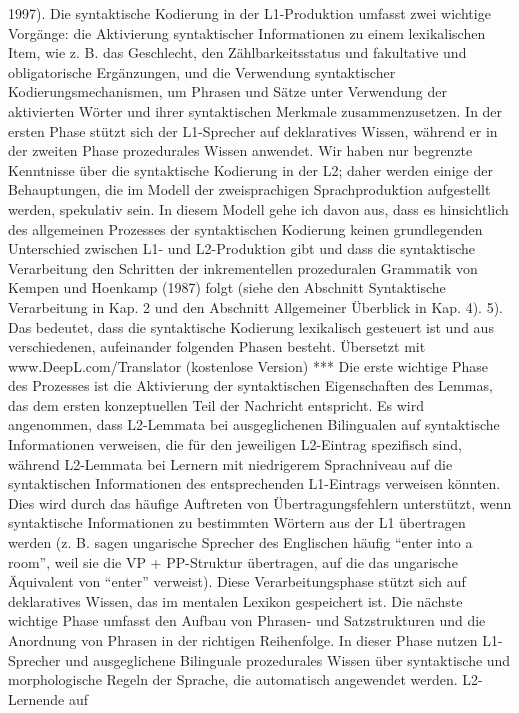 \documentclass[
  letterpaper,
]{scrbook}
\begin{document}
{{1997). Die syntaktische Kodierung in der L1-Produktion umfasst zwei
wichtige Vorgänge: die Aktivierung syntaktischer Informationen zu einem
lexikalischen Item, wie z. B. das Geschlecht, den Zählbarkeitsstatus und
fakultative und obligatorische Ergänzungen, und die Verwendung
syntaktischer Kodierungsmechanismen, um Phrasen und Sätze unter
Verwendung der aktivierten Wörter und ihrer syntaktischen Merkmale
zusammenzusetzen. In der ersten Phase stützt sich der L1-Sprecher auf
deklaratives Wissen, während er in der zweiten Phase prozedurales Wissen
anwendet. Wir haben nur begrenzte Kenntnisse über die syntaktische
Kodierung in der L2; daher werden einige der Behauptungen, die im Modell
der zweisprachigen Sprachproduktion aufgestellt werden, spekulativ sein.
In diesem Modell gehe ich davon aus, dass es hinsichtlich des
allgemeinen Prozesses der syntaktischen Kodierung keinen grundlegenden
Unterschied zwischen L1- und L2-Produktion gibt und dass die
syntaktische Verarbeitung den Schritten der inkrementellen prozeduralen
Grammatik von Kempen und Hoenkamp (1987) folgt (siehe den Abschnitt
Syntaktische Verarbeitung in Kap. 2 und den Abschnitt Allgemeiner
Überblick in Kap. 4). 5). Das bedeutet, dass die syntaktische Kodierung
lexikalisch gesteuert ist und aus verschiedenen, aufeinander folgenden
Phasen besteht. }} Übersetzt mit www.DeepL.com/Translator (kostenlose
Version) *** Die erste wichtige Phase des Prozesses ist die Aktivierung
der syntaktischen Eigenschaften des Lemmas, das dem ersten konzeptuellen
Teil der Nachricht entspricht. Es wird angenommen, dass L2-Lemmata bei
ausgeglichenen Bilingualen auf syntaktische Informationen verweisen, die
für den jeweiligen L2-Eintrag spezifisch sind, während L2-Lemmata bei
Lernern mit niedrigerem Sprachniveau auf die syntaktischen Informationen
des entsprechenden L1-Eintrags verweisen könnten. Dies wird durch das
häufige Auftreten von Übertragungsfehlern unterstützt, wenn syntaktische
Informationen zu bestimmten Wörtern aus der L1 übertragen werden (z. B.
sagen ungarische Sprecher des Englischen häufig ``enter into a room'',
weil sie die VP + PP-Struktur übertragen, auf die das ungarische
Äquivalent von ``enter'' verweist). Diese Verarbeitungsphase stützt sich
auf deklaratives Wissen, das im mentalen Lexikon gespeichert ist. Die
nächste wichtige Phase umfasst den Aufbau von Phrasen- und
Satzstrukturen und die Anordnung von Phrasen in der richtigen
Reihenfolge. In dieser Phase nutzen L1-Sprecher und ausgeglichene
Bilinguale prozedurales Wissen über syntaktische und morphologische
Regeln der Sprache, die automatisch angewendet werden. L2-Lernende auf
\end{document}
